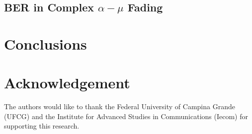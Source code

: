 \documentclass[conference, 10pt]{IEEEtran}
\begin{document}
\subsection{BER in Complex $\alpha-\mu$ Fading}

\section{Conclusions}

\section*{Acknowledgement}
The authors would like to thank the Federal University of Campina Grande (UFCG)
and the Institute for Advanced Studies in Communications (Iecom) for supporting
this research.



\end{document}
